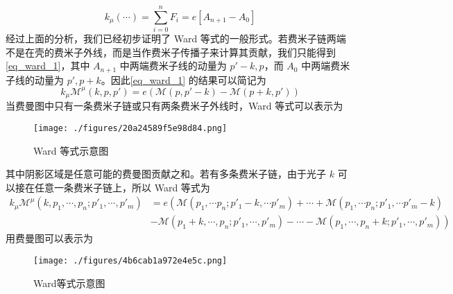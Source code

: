 \begin{equation}\label{eq_ward_1}
k_\mu (\cdots) = \sum_{i=0}^n F_i = e[A_{n+1}-A_0]
\end{equation}
经过上面的分析，我们已经初步证明了 Ward 等式的一般形式。若费米子链两端不是在壳的费米子外线，而是当作费米子传播子来计算其贡献，我们只能得到\autoref{eq_ward_1}，其中 $A_{n+1}$ 中两端费米子线的动量为 $p'-k,p$，而 $A_{0}$ 中两端费米子线的动量为 $p',p+k$。因此\autoref{eq_ward_1} 的结果可以简记为
\begin{equation}\label{eq_ward_3}
k_\mu\mathcal{M}^\mu(k,p,p') = e(\mathcal{M}(p,p'-k)-\mathcal{M}(p+k,p'))
\end{equation}
当费曼图中只有一条费米子链或只有两条费米子外线时，Ward 等式可以表示为
\begin{figure}[ht]
\centering
\texttt{[image: ./figures/20a24589f5e98d84.png]}
\caption{Ward 等式示意图} \label{fig_ward_5}
\end{figure}
其中阴影区域是任意可能的费曼图贡献之和。若有多条费米子链，由于光子 $k$ 可以接在任意一条费米子链上，所以 Ward 等式为
\begin{equation}\label{eq_ward_2}
\begin{aligned}
k_\mu\mathcal{M}^\mu(k,p_1,\cdots,p_n;p'_1,\cdots,p'_m)
&= e\left(
\mathcal{M}(p_1,\cdots p_n;p'_1-k,\cdots p'_m)+\cdots+\mathcal{M}(p_1,\cdots p_n;p'_1,\cdots p'_m-k)
\right.
\\
&\left.-\mathcal{M}(p_1+k,\cdots,p_n;p'_1,\cdots,p'_m)-\cdots-\mathcal{M}(p_1,\cdots,p_n+k;p'_1,\cdots,p'_m)
\right)
\end{aligned}
\end{equation}
用费曼图可以表示为
\begin{figure}[ht]
\centering
\texttt{[image: ./figures/4b6cab1a972e4e5c.png]}
\caption{Ward等式示意图} \label{fig_ward_7}
\end{figure}
